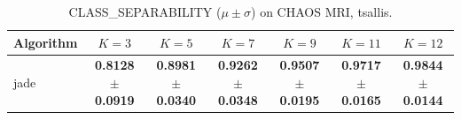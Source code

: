\begin{table}[htbp]
\centering
\caption{CLASS_SEPARABILITY ($\mu \pm \sigma$) on CHAOS MRI, tsallis.}
\label{tab:exp2-tsallis-class_separability}
\begin{tabular}{lcccccc}
\toprule
Algorithm & $K=3$ & $K=5$ & $K=7$ & $K=9$ & $K=11$ & $K=12$ \\
\midrule
jade & \textbf{0.8128 $\pm$ 0.0919} & \textbf{0.8981 $\pm$ 0.0340} & \textbf{0.9262 $\pm$ 0.0348} & \textbf{0.9507 $\pm$ 0.0195} & \textbf{0.9717 $\pm$ 0.0165} & \textbf{0.9844 $\pm$ 0.0144} \\
\bottomrule
\end{tabular}
\end{table}